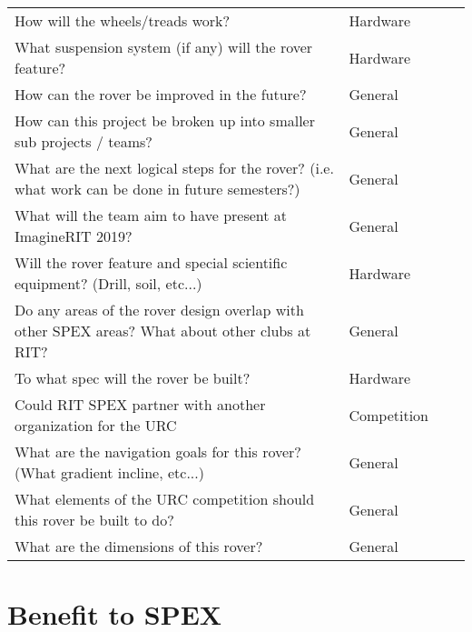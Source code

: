 \documentclass[conference]{IEEEtran} %
\begin{document}
\begin{table*}
\begin{tabular}{@{}llcc@{}}
        How will the wheels/treads work? & Hardware \\
        What suspension system (if any) will the rover feature? & Hardware \\
        How can the rover be improved in the future? & General \\
        How can this project be broken up into smaller sub projects / teams? & General \\
        What are the next logical steps for the rover? (i.e. what work can be done in future semesters?) & General \\
        What will the team aim to have present at ImagineRIT 2019? & General \\ 
        Will the rover feature and special scientific equipment? (Drill, soil, etc...) & Hardware \\
        Do any areas of the rover design overlap with other SPEX areas? What about other clubs at RIT? & General \\
        To what spec will the rover be built? & Hardware \\
        Could RIT SPEX partner with another organization for the URC & Competition \\
        What are the navigation goals for this rover? (What gradient incline, etc...) & General \\
        What elements of the URC competition should this rover be built to do? & General \\
        What are the dimensions of this rover? & General \\
        \bottomrule
    \end{tabular}
\label{tab:questions}
\end{table*}

\section{Benefit to SPEX}
\label{sec:benefit}
\end{document}
